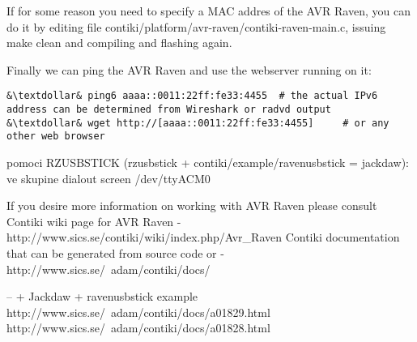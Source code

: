 \documentclass{article}
\begin{document}
If for some reason you need to specify a MAC addres of the AVR Raven, you can do it by editing file contiki/platform/avr-raven/contiki-raven-main.c,
issuing make clean and compiling and flashing again.


Finally we can ping the AVR Raven and use the webserver running on it:
\begin{lstlisting}
&\textdollar& ping6 aaaa::0011:22ff:fe33:4455  # the actual IPv6 address can be determined from Wireshark or radvd output
&\textdollar& wget http://[aaaa::0011:22ff:fe33:4455]     # or any other web browser
\end{lstlisting}
 


pomoci RZUSBSTICK (rzusbstick + contiki/example/ravenusbstick = jackdaw):
ve skupine dialout
screen /dev/ttyACM0



If you desire more information on working with AVR Raven please consult
Contiki wiki page for AVR Raven - http://www.sics.se/contiki/wiki/index.php/Avr\_Raven
Contiki documentation that can be generated from source code or - http://www.sics.se/~adam/contiki/docs/

-- + Jackdaw + ravenusbstick example
http://www.sics.se/~adam/contiki/docs/a01829.html
http://www.sics.se/~adam/contiki/docs/a01828.html
\end{document}
